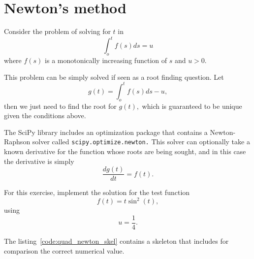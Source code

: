\section{Newton's method}
\label{sec:quad_newton}

Consider the problem of solving for $t$ in\begin{equation}
\int_{o}^{t}f(s)ds=u\end{equation}
 where $f(s)$ is a monotonically increasing function of $s$ and
$u>0$.

This problem can be simply solved if seen as a root finding question.
Let\begin{equation}
g(t)=\int_{o}^{t}f(s)ds-u,\end{equation}
then we just need to find the root for $g(t),$ which is guaranteed
to be unique given the conditions above. 

The SciPy library includes an optimization package that contains a
Newton-Raphson solver called \texttt{scipy.optimize.newton.} This
solver can optionally take a known derivative for the function whose
roots are being sought, and in this case the derivative is simply
\begin{equation}
\frac{dg(t)}{dt}=f(t).\end{equation}


For this exercise, implement the solution for the test function\[
f(t)=t\sin^{2}(t),\]
 using \[
u=\frac{1}{4}.\]


The listing~\ref{code:quad_newton_skel} contains a skeleton that
includes for comparison the correct numerical value.




